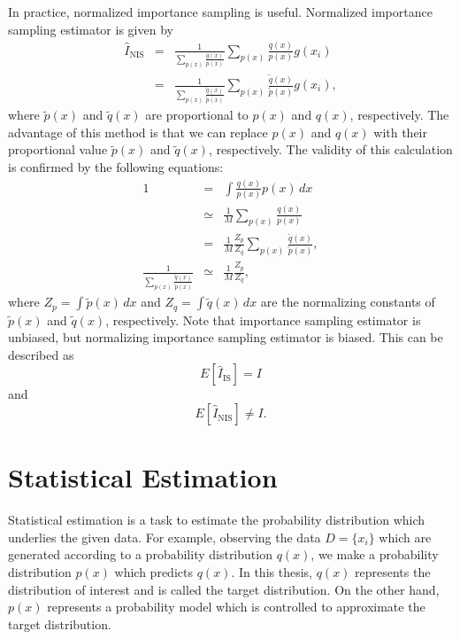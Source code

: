 In practice, normalized importance sampling is useful.
Normalized importance sampling estimator is given by
\begin{eqnarray}
 \hat I_{\mathrm{NIS}} &=& \frac{1}{\sum_{p(x)} \frac{q(x)}{p(x)}} \sum_{p(x)}
  \frac{q(x)}{p(x)} g(x_i)\\
&=& \frac{1}{\sum_{p(x)} \frac{\tilde q(x)}{\tilde p(x)}} \sum_{p(x)}
 \frac{\tilde q(x)}{\tilde p(x)} g(x_i),
\end{eqnarray}
where $\tilde p(x)$ and $\tilde q(x)$ are proportional to $p(x)$ and
$q(x)$, respectively.  
The advantage of this method is
that we can replace $p(x)$ and $q(x)$ with
their proportional value $\tilde p(x)$ and $\tilde q(x)$, respectively.
The validity of this calculation is 
confirmed by the following equations:
\begin{eqnarray}
1  &=&\int \frac{q(x)}{p(x)}p(x) \, dx\\
 &\simeq& \frac{1}{M} \sum_{p(x)} \frac{q(x)}{p(x)}\\
 &=& \frac{1}{M} \frac{Z_p}{Z_q} \sum_{p(x)} \frac{\tilde q(x)}{\tilde
  p(x)},\\
\frac{1}{\sum_{p(x)} \frac{\tilde q(x)}{\tilde p(x)}}
&\simeq&
\frac{1}{M} \frac{Z_p}{Z_q},
\end{eqnarray}
where $Z_p=\int \tilde p(x) \, dx$ and $Z_q=\int \tilde q(x) \, dx$ are the normalizing constants of
$\tilde p(x)$ and $ \tilde q(x)$, respectively.
Note that importance sampling estimator is unbiased,
but normalizing importance sampling estimator is biased.
This can be described as
\begin{equation}
 E[\hat I_{\mathrm{IS}}]=I
\end{equation}
and
\begin{equation}
 E[\hat I_{\mathrm{NIS}}] \neq I.
\end{equation}

\section{Statistical Estimation}
Statistical estimation is a task to 
estimate the probability distribution which underlies the given data.
For example, 
observing the data $D=\{x_i\}$ which are generated according to 
a probability distribution $q(x)$,  
we make a probability distribution $p(x)$ which predicts $q(x)$.
In this thesis, $q(x)$ represents the distribution of interest
and is called the target distribution.
On the other hand, $p(x)$ represents a probability model
which is controlled to approximate the target distribution.



